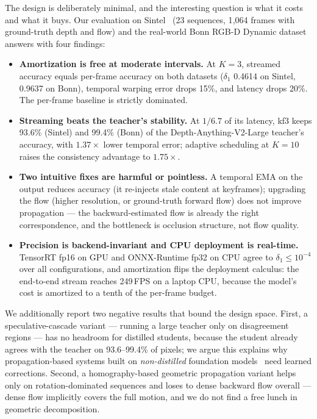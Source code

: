 \documentclass[10pt,twocolumn]{article}
\begin{document}
The design is deliberately minimal, and the interesting question is what it
costs and what it buys. Our evaluation on Sintel~\cite{sintel} (23 sequences,
1{,}064 frames with ground-truth depth and flow) and the real-world Bonn
RGB-D Dynamic dataset~\cite{bonn} answers with four findings:

\begin{itemize}
  \item \textbf{Amortization is free at moderate intervals.} At $K{=}3$,
  streamed accuracy equals per-frame accuracy on both datasets
  ($\delta_1$ 0.4614 on Sintel, 0.9637 on Bonn), temporal warping error drops
  15\%, and latency drops 20\%. The per-frame baseline is strictly dominated.
  \item \textbf{Streaming beats the teacher's stability.} At $1/6.7$ of its
  latency, kf3 keeps 93.6\% (Sintel) and 99.4\% (Bonn) of the
  Depth-Anything-V2-Large teacher's accuracy, with $1.37\times$ lower temporal
  error; adaptive scheduling at $K{=}10$ raises the consistency advantage to
  $1.75\times$.
  \item \textbf{Two intuitive fixes are harmful or pointless.} A temporal EMA
  on the output reduces accuracy (it re-injects stale content at keyframes);
  upgrading the flow (higher resolution, or ground-truth forward flow) does
  not improve propagation --- the backward-estimated flow is already the right
  correspondence, and the bottleneck is occlusion structure, not flow quality.
  \item \textbf{Precision is backend-invariant and CPU deployment is real-time.}
  TensorRT fp16 on GPU and ONNX-Runtime fp32 on CPU agree to
  $\delta_1 \leq 10^{-4}$ over all configurations, and amortization flips the
  deployment calculus: the end-to-end stream reaches 249\,FPS on a laptop CPU,
  because the model's cost is amortized to a tenth of the per-frame budget.
\end{itemize}

We additionally report two negative results that bound the design space.
First, a speculative-cascade variant --- running a large teacher only on
disagreement regions --- has no headroom for distilled students, because the
student already agrees with the teacher on 93.6--99.4\% of pixels; we argue
this explains why propagation-based systems built on \emph{non-distilled}
foundation models~\cite{velodepth} need learned corrections. Second, a
homography-based geometric propagation variant helps only on rotation-dominated
sequences and loses to dense backward flow overall --- dense flow implicitly
covers the full motion, and we do not find a free lunch in geometric
decomposition.
\end{document}
